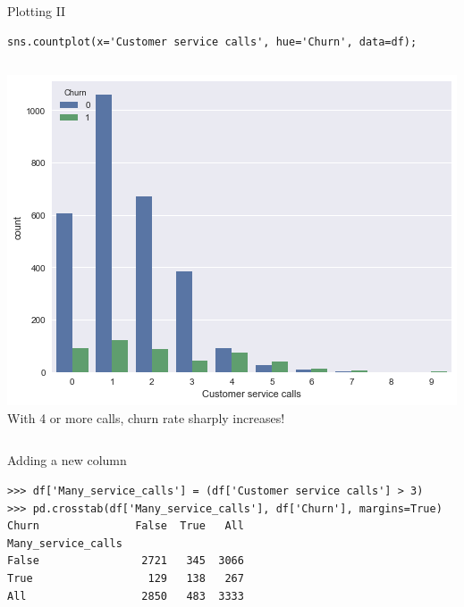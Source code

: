 \documentclass[aspectratio=169,usenames,dvipsnames]{beamer}
\begin{document}
\begin{frame}[fragile]{Plotting II}
\begin{lstlisting}
sns.countplot(x='Customer service calls', hue='Churn', data=df);
\end{lstlisting}

\begin{columns}
\includegraphics[height=0.6\textheight]{fig/telecomplot2}
With 4 or more calls, churn rate sharply increases!
\end{columns}
\end{frame}

\begin{frame}[fragile]{Adding a new column}
\begin{lstlisting}
>>> df['Many_service_calls'] = (df['Customer service calls'] > 3)
>>> pd.crosstab(df['Many_service_calls'], df['Churn'], margins=True)
Churn               False  True   All
Many_service_calls
False                2721   345  3066
True                  129   138   267
All                  2850   483  3333
\end{lstlisting}
\end{frame}
\end{document}
